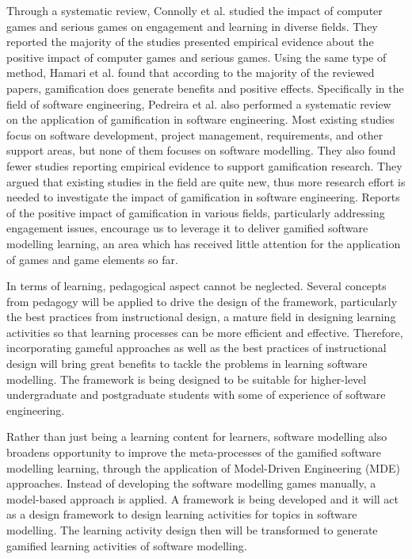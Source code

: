 \documentclass[12pt, a4paper]{report} \usepackage[titletoc]{appendix}
\begin{document}
Through a systematic review, Connolly et al. \cite{connolly2012systematic} studied the impact of computer games and serious games on engagement and learning in diverse fields. They reported the majority of the studies presented empirical evidence about the positive impact of computer games and serious games. Using the same type of method, Hamari et al. \cite{hamari2014does} found that according to the majority of the reviewed papers, gamification does generate benefits and positive effects. Specifically in the field of software engineering, Pedreira et al. \cite{Pedreira2015} also performed a systematic review on the application of gamification in software engineering. Most existing studies focus on software development, project management, requirements, and other support areas, but none of them focuses on software modelling. They also found fewer studies reporting empirical evidence to support gamification research. They argued that existing studies in the field are quite new, thus more research effort is needed to investigate the impact of gamification in software engineering. Reports of the positive impact of gamification in various fields, particularly addressing engagement issues, encourage us to leverage it to deliver gamified software modelling learning, an area which has received little attention for the application of games and game elements so far. 

In terms of learning, pedagogical aspect cannot be neglected. Several concepts from pedagogy will be applied to drive the design of the framework, particularly the best practices from instructional design, a mature field in designing learning activities so that learning processes can be more efficient and effective. Therefore, incorporating gameful approaches as well as the best practices of instructional design will bring great benefits to tackle the problems in learning software modelling. The framework is being designed to be suitable for higher-level undergraduate and postgraduate students with some of experience of software engineering. 

Rather than just being a learning content for learners, software modelling also broadens opportunity to improve the meta-processes of the gamified software modelling learning, through the application of Model-Driven Engineering (MDE) approaches. Instead of developing the software modelling games manually, a model-based approach is applied. A framework is being developed and it will act as a design framework to design learning activities for topics in software modelling. The learning activity design then will be transformed to generate gamified learning activities of software modelling. 
\end{document}
